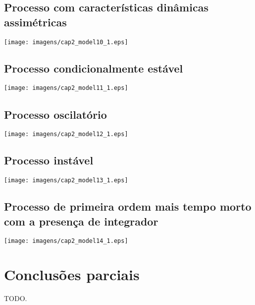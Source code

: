 \subsection{Processo com características dinâmicas assimétricas}

    \begin{center}
        \texttt{[image: imagens/cap2\_model10\_1.eps]}
    \end{center}

\subsection{Processo condicionalmente estável}

    \begin{center}
        \texttt{[image: imagens/cap2\_model11\_1.eps]}
    \end{center}

\subsection{Processo oscilatório}

    \begin{center}
        \texttt{[image: imagens/cap2\_model12\_1.eps]}
    \end{center}

\subsection{Processo instável}

    \begin{center}
        \texttt{[image: imagens/cap2\_model13\_1.eps]}
    \end{center}

\subsection{Processo de primeira ordem mais tempo morto com a presença de integrador}

    \begin{center}
        \texttt{[image: imagens/cap2\_model14\_1.eps]}
    \end{center}

\section{Conclusões parciais}

    TODO.
